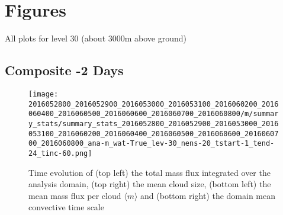\documentclass[a4paper, 12pt]{article}
\begin{document}
\newpage

{\small
 }

\newpage
\section{Figures}
All plots for level 30 (about 3000m above ground)

\subsection{Composite -2 Days}



\begin{figure}[ht] \label{fig:summary_stats}
\noindent \centering
\texttt{[image: 2016052800\_2016052900\_2016053000\_2016053100\_2016060200\_2016060400\_2016060500\_2016060600\_2016060700\_2016060800/m/summary\_stats/summary\_stats\_2016052800\_2016052900\_2016053000\_2016053100\_2016060200\_2016060400\_2016060500\_2016060600\_2016060700\_2016060800\_ana-m\_wat-True\_lev-30\_nens-20\_tstart-1\_tend-24\_tinc-60.png]}\\
\caption{Time evolution of (top left) the total mass flux integrated over the analysis domain, (top right) the mean cloud size, (bottom left) the mean mass flux per cloud $\langle m \rangle$ and (bottom right) the domain mean convective time scale}
\end{figure}
\end{document}
